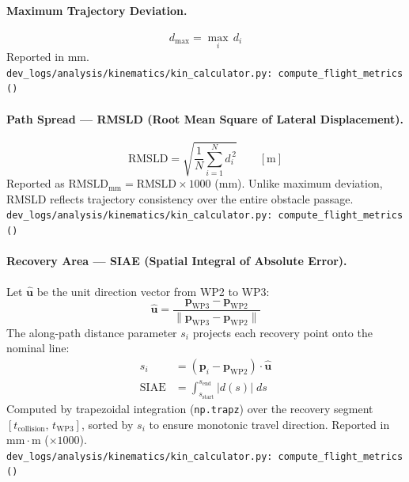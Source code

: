 \medskip
\paragraph{Maximum Trajectory Deviation.}
\begin{equation}
    d_{\max} = \max_i\, d_i
\end{equation}
Reported in mm.\\
\texttt{\small dev\_logs/analysis/kinematics/kin\_calculator.py:\ compute\_flight\_metrics()}

\medskip
\paragraph{Path Spread --- RMSLD (Root Mean Square of Lateral Displacement).}
\begin{equation}
    \mathrm{RMSLD} = \sqrt{\frac{1}{N}\sum_{i=1}^{N} d_i^{\,2}} \qquad [\mathrm{m}]
\end{equation}
Reported as $\mathrm{RMSLD}_{\text{mm}} = \mathrm{RMSLD} \times 1000$ (mm). Unlike maximum deviation, RMSLD reflects trajectory consistency over the entire obstacle passage.\\
\texttt{\small dev\_logs/analysis/kinematics/kin\_calculator.py:\ compute\_flight\_metrics()}

\medskip
\paragraph{Recovery Area --- SIAE (Spatial Integral of Absolute Error).}
Let $\hat{\mathbf{u}}$ be the unit direction vector from WP2 to WP3:
\begin{equation}
    \hat{\mathbf{u}} = \frac{\mathbf{p}_{\text{WP3}} - \mathbf{p}_{\text{WP2}}}{\|\mathbf{p}_{\text{WP3}} - \mathbf{p}_{\text{WP2}}\|}
\end{equation}
The along-path distance parameter $s_i$ projects each recovery point onto the nominal line:
\begin{align}
    s_i &= (\mathbf{p}_i - \mathbf{p}_{\text{WP2}}) \cdot \hat{\mathbf{u}} \\
    \mathrm{SIAE} &= \int_{s_{\text{start}}}^{s_{\text{end}}} |d(s)| \; ds
\end{align}
Computed by trapezoidal integration (\texttt{np.trapz}) over the recovery segment $[t_{\text{collision}},\, t_{\text{WP3}}]$, sorted by $s_i$ to ensure monotonic travel direction. Reported in $\mathrm{mm \cdot m}$ ($\times 1000$).\\
\texttt{\small dev\_logs/analysis/kinematics/kin\_calculator.py:\ compute\_flight\_metrics()}

